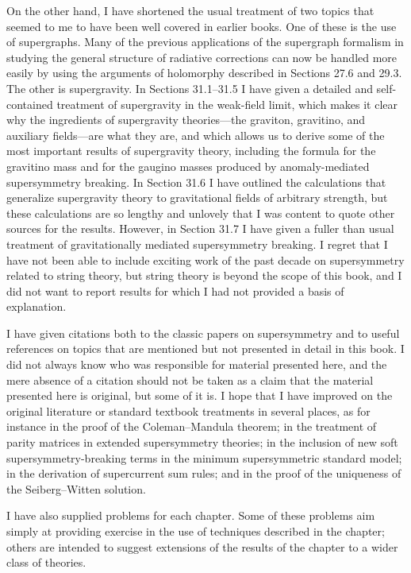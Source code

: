 On the other hand, I have shortened the usual treatment of two topics that
seemed to me to have been well covered in earlier books. One of these is the
use of supergraphs. Many of the previous applications of the supergraph
formalism in studying the general structure of radiative corrections can now
be handled more easily by using the arguments of holomorphy described in
Sections 27.6 and 29.3. The other is supergravity. In Sections 31.1--31.5 I have
given a detailed and self-contained treatment of supergravity in the weak-field
limit, which makes it clear why the ingredients of supergravity theories---the
graviton, gravitino, and auxiliary fields---are what they are, and which allows
us to derive some of the most important results of supergravity theory,
including the formula for the gravitino mass and for the gaugino masses
produced by anomaly-mediated supersymmetry breaking. In Section 31.6 I have
outlined the calculations that generalize supergravity theory to gravitational
fields of arbitrary strength, but these calculations are so lengthy and
unlovely that I was content to quote other sources for the results. However, in
Section 31.7 I have given a fuller than usual treatment of gravitationally
mediated supersymmetry breaking. I regret that I have not been able to include
exciting work of the past decade on supersymmetry related to string theory, but
string theory is beyond the scope of this book, and I did not want to report
results for which I had not provided a basis of explanation.

I have given citations both to the classic papers on supersymmetry and to
useful references on topics that are mentioned but not presented in detail in
this book. I did not always know who was responsible for material presented
here, and the mere absence of a citation should not be taken as a claim that
the material presented here is original, but some of it is. I hope that I have
improved on the original literature or standard textbook treatments in several
places, as for instance in the proof of the Coleman--Mandula theorem; in the
treatment of parity matrices in extended supersymmetry theories; in the
inclusion of new soft supersymmetry-breaking terms in the minimum
supersymmetric standard model; in the derivation of supercurrent sum rules; and
in the proof of the uniqueness of the Seiberg--Witten solution.

I have also supplied problems for each chapter. Some of these problems aim
simply at providing exercise in the use of techniques described in the
chapter; others are intended to suggest extensions of the results of the
chapter to a wider class of theories.

